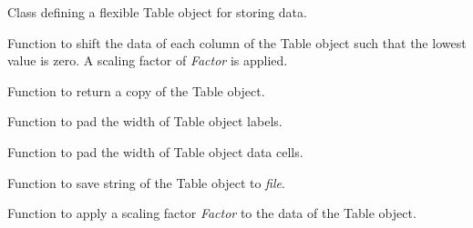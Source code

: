 \documentclass[letterpaper,10pt,english]{sphinxmanual}
\begin{document}
\begin{fulllineitems}
\label{index:text.Table}
Class defining a flexible Table object for storing data.

\begin{fulllineitems}
\label{index:text.Table.absolute_to_relative}
Function to shift the data of each column of the Table object
such that the lowest value is zero. A scaling factor of \emph{Factor} is applied.

\end{fulllineitems}


\begin{fulllineitems}
\label{index:text.Table.copy}
Function to return a copy of the Table object.

\end{fulllineitems}


\begin{fulllineitems}
\label{index:text.Table.format_label}
Function to pad the width of Table object labels.

\end{fulllineitems}


\begin{fulllineitems}
\label{index:text.Table.format_values}
Function to pad the width of Table object data cells.

\end{fulllineitems}


\begin{fulllineitems}
\label{index:text.Table.save}
Function to save string of the Table object to \emph{file}.

\end{fulllineitems}


\begin{fulllineitems}
\label{index:text.Table.scale}
Function to apply a scaling factor \emph{Factor} to the
data of the Table object.

\end{fulllineitems}


\end{fulllineitems}
\end{document}
